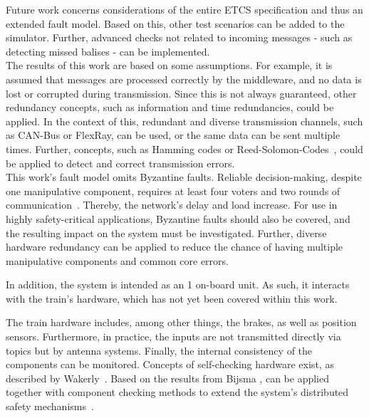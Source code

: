 Future work concerns considerations of the entire ETCS specification and thus an extended fault model.
Based on this, other test scenarios can be added to the simulator.
Further, advanced checks not related to incoming messages - such as detecting missed balises - can be implemented.
\\

The results of this work are based on some assumptions.
For example, it is assumed that messages are processed correctly by the middleware, and no data is lost or corrupted during transmission.
Since this is not always guaranteed, other redundancy concepts, such as information and time redundancies, could be applied.
In the context of this, redundant and diverse transmission channels, such as CAN-Bus or FlexRay, can be used, or the same data can be sent multiple times.
Further,  concepts, such as Hamming codes or Reed-Solomon-Codes~\cite{ReedSolomonCodes}, could be applied to detect and correct transmission errors.
\\

This work's fault model omits Byzantine faults.
Reliable decision-making, despite one manipulative component, requires at least four voters and two rounds of communication~\cite{GamerIncreasingMOON}.
Thereby, the network's delay and load increase.
For use in highly safety-critical applications, Byzantine faults should also be covered, and the resulting impact on the system must be investigated.
Further, diverse hardware redundancy can be applied to reduce the chance of having multiple manipulative components and common core errors.

In addition, the system is intended as an 1 on-board unit.
As such, it interacts with the train's hardware, which has not yet been covered within this work.

The train hardware includes, among other things, the brakes, as well as position sensors.
Furthermore, in practice, the inputs are not transmitted directly via  topics but by antenna systems.
Finally, the internal consistency of the components can be monitored.
Concepts of self-checking hardware exist, as described by Wakerly~\cite{SelfCheckingProcessorDesign}.
Based on the results from Bijsma \etal,  can be applied together with component checking methods to extend the system's distributed safety mechanisms~\cite{DistributedSafety2020}.